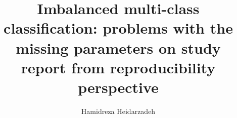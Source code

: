 \author{Hamidreza Heidarzadeh}
\title{Imbalanced multi-class classification: problems with the missing parameters on study report from reproducibility perspective}

